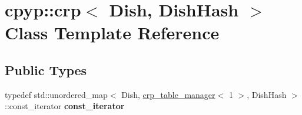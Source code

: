 \hypertarget{classcpyp_1_1crp}{}\section{cpyp\+:\+:crp$<$ Dish, Dish\+Hash $>$ Class Template Reference}
\label{classcpyp_1_1crp}
\subsection*{Public Types}
\begin{DoxyCompactItemize}
\item 
\mbox{\label{classcpyp_1_1crp_ab4bd486b7a714b0330b8ac16de13cec6}} 
typedef std\+::unordered\+\_\+map$<$ Dish, \mbox{\hyperlink{structcpyp_1_1crp__table__manager}{crp\+\_\+table\+\_\+manager}}$<$ 1 $>$, Dish\+Hash $>$\+::const\+\_\+iterator {\bfseries const\+\_\+iterator}
\end{DoxyCompactItemize}
